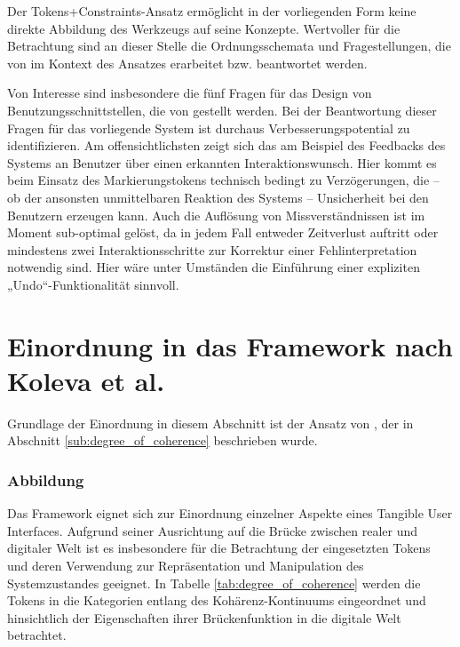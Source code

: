 Der Tokens+Constraints-Ansatz ermöglicht in der vorliegenden Form keine direkte Abbildung des Werkzeugs auf seine Konzepte. Wertvoller für die Betrachtung sind an dieser Stelle die Ordnungsschemata und Fragestellungen, die von \citet{Ullmer05} im Kontext des Ansatzes erarbeitet bzw. beantwortet werden. 

Von Interesse sind insbesondere die fünf Fragen für das Design von Benutzungsschnittstellen, die von  \citep{Bellotti02} gestellt werden. Bei der Beantwortung dieser Fragen für das vorliegende System ist durchaus Verbesserungspotential zu identifizieren. Am offensichtlichsten zeigt sich das am Beispiel des Feedbacks des Systems an Benutzer über einen erkannten Interaktionswunsch. Hier kommt es beim Einsatz des Markierungstokens technisch bedingt zu Verzögerungen, die -- ob der ansonsten unmittelbaren Reaktion des Systems -- Unsicherheit bei den Benutzern erzeugen kann. Auch die Auflösung von Missverständnissen ist im Moment sub-optimal gelöst, da in jedem Fall entweder Zeitverlust auftritt oder mindestens zwei Interaktionsschritte zur Korrektur einer Fehlinterpretation notwendig sind. Hier wäre unter Umständen die Einführung einer expliziten „Undo“-Funktionalität sinnvoll.


\section{Einordnung in das Framework nach Koleva et al.} %
\label{sec:einordnung_in_das_framework_nach_koleva_et_al_}

Grundlage der Einordnung in diesem Abschnitt ist der Ansatz von \citet{Koleva03}, der in Abschnitt \ref{sub:degree_of_coherence} beschrieben wurde.

\subsubsection{Abbildung} %
\label{sub:abbildung}

Das Framework eignet sich zur Einordnung einzelner Aspekte eines Tangible User Interfaces. Aufgrund seiner Ausrichtung auf die Brücke zwischen realer und digitaler Welt ist es insbesondere für die Betrachtung der eingesetzten Tokens und deren Verwendung zur Repräsentation und Manipulation des Systemzustandes geeignet. In Tabelle \ref{tab:degree_of_coherence} werden die Tokens in die Kategorien entlang des Kohärenz-Kontinuums eingeordnet und hinsichtlich der Eigenschaften ihrer Brückenfunktion in die digitale Welt betrachtet. 

